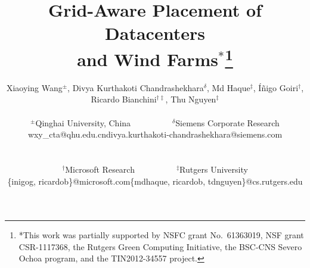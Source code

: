 \documentclass[conference]{IEEEtran}
\begin{document}
\title{Grid-Aware Placement of Datacenters\\and Wind
  Farms$^*$\thanks{*This work was partially supported by NSFC
    grant No.~61363019, NSF grant CSR-1117368, the Rutgers Green Computing
    Initiative, the BSC-CNS Severo Ochoa program, and the
    TIN2012-34557 project.}
\vspace{-0.5in}
}

%
 \author{
Xiaoying Wang$^\pm$, Divya Kurthakoti Chandrashekhara$^\delta$, Md
Haque$^\ddag$, \'I\~{n}igo Goiri$^{\dag}$, Ricardo
Bianchini$^{\dag\ddag}$, Thu Nguyen$^\ddag$\\
[.075in]
\begin{tabular}{ccc}
  $^\pm$Qinghai University, China & ~~~~~~~~~~ & $^\delta$Siemens Corporate Research \\
  wxy\_cta@qhu.edu.cn & & divya.kurthakoti-chandrashekhara@siemens.com \\
\end{tabular}\\
[0.075in]
\begin{tabular}{ccc}
    $^\dag$Microsoft Research & ~~~~~~~~~~ & $^\ddag$Rutgers University \\
    \{inigog, ricardob\}@microsoft.com & & \{mdhaque, ricardob, tdnguyen\}@cs.rutgers.edu\\
\end{tabular}
}


\date{}

\maketitle








%



\end{document}
